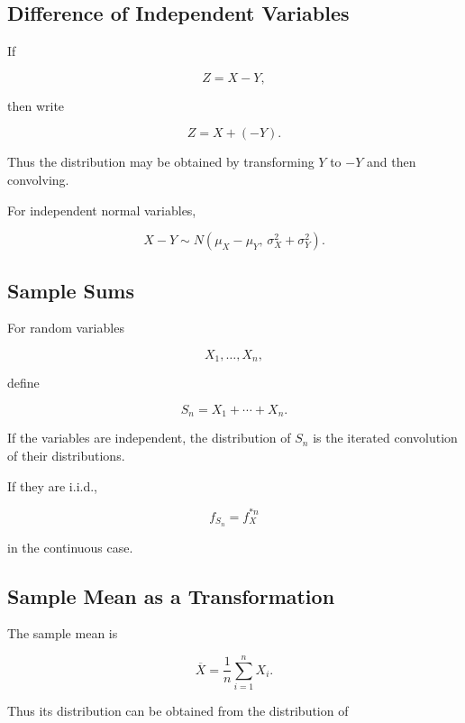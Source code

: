 \subsection{Difference of Independent Variables}
\label{subsec:difference-independent-variables}

If

\[
Z=X-Y,
\]

then write

\[
Z=X+(-Y).
\]

Thus the distribution may be obtained by transforming \(Y\) to \(-Y\)
and then convolving.

For independent normal variables,

\[
\boxed{
X-Y
\sim
N
\left(
\mu_X-\mu_Y,
\,
\sigma_X^2+\sigma_Y^2
\right).
}
\]

\subsection{Sample Sums}
\label{subsec:sample-sums}

For random variables

\[
X_1,\ldots,X_n,
\]

define

\[
\boxed{
S_n
=
X_1+\cdots+X_n.
}
\]

If the variables are independent, the distribution of \(S_n\) is the
iterated convolution of their distributions.

If they are i.i.d.,

\[
\boxed{
f_{S_n}
=
f_X^{*n}
}
\]

in the continuous case.

\subsection{Sample Mean as a Transformation}
\label{subsec:sample-mean-transformation}

The sample mean is

\[
\boxed{
\overline{X}
=
\frac1n
\sum_{i=1}^{n}X_i.
}
\]

Thus its distribution can be obtained from the distribution of

